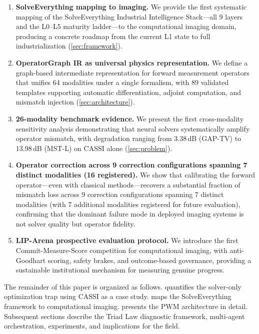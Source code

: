 \begin{enumerate}
  \item \textbf{SolveEverything mapping to imaging.}
        We provide the first systematic mapping of the SolveEverything
        Industrial Intelligence Stack---all 9 layers and the L0--L5
        maturity ladder---to the computational imaging domain, producing
        a concrete roadmap from the current L1 state to full
        industrialization (\cref{sec:framework}).

  \item \textbf{OperatorGraph IR as universal physics representation.}
        We define a graph-based intermediate representation for forward
        measurement operators that unifies 64 modalities under a single
        formalism, with 89 validated templates supporting automatic
        differentiation, adjoint computation, and mismatch injection
        (\cref{sec:architecture}).

  \item \textbf{26-modality benchmark evidence.}
        We present the first cross-modality sensitivity analysis
        demonstrating that neural solvers systematically amplify
        operator mismatch, with degradation ranging from 3.38\,dB
        (GAP-TV) to 13.98\,dB (MST-L) on CASSI alone
        (\cref{sec:problem}).

  \item \textbf{Operator correction across 9 correction configurations
        spanning 7 distinct modalities (16 registered).}
        We show that calibrating the forward operator---even with
        classical methods---recovers a substantial fraction of mismatch
        loss across 9 correction configurations spanning 7 distinct modalities (with 7 additional
        modalities registered for future evaluation), confirming that the
        dominant failure mode in deployed imaging systems is not solver
        quality but operator fidelity.

  \item \textbf{LIP-Arena prospective evaluation protocol.}
        We introduce the first Commit-Measure-Score competition for
        computational imaging, with anti-Goodhart scoring, safety
        brakes, and outcome-based governance, providing a sustainable
        institutional mechanism for measuring genuine progress.
\end{enumerate}

The remainder of this paper is organized as follows.
 quantifies the solver-only optimization trap using
CASSI as a case study.
 maps the SolveEverything framework to
computational imaging.
 presents the PWM architecture in detail.
Subsequent sections describe the Triad Law diagnostic framework,
multi-agent orchestration, experiments, and implications for the field.
